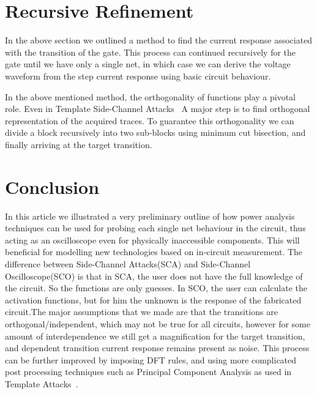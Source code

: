 \documentclass[a4]{IEEEtran}
\begin{document}
\vspace{1em}
\section{Recursive Refinement}
In the above section we outlined a method to find the current response associated with the  transition of the  gate.
This process can continued recursively for the  gate until we have only a single net, in which case we can derive
the voltage waveform from the step current response using basic circuit behaviour.

In the above mentioned method, the orthogonality of  functions play a pivotal role. Even in Template Side-Channel Attacks~\cite{Template}
A major step is to find orthogonal representation of the acquired traces.
To guarantee this orthogonality
we can divide a block recursively into two sub-blocks using minimum cut bisection, and finally arriving at the target transition.

\section{Conclusion}

In this article we illustrated a very preliminary outline of how power analysis techniques can be used for probing each single net 
behaviour in the circuit, thus acting as an oscilloscope even for physically inaccessible components. This will beneficial for modelling 
new technologies based on in-circuit measurement. The difference between Side-Channel Attacks(SCA)
and Side-Channel Oscilloscope(SCO) is that in SCA, the user does not have the full knowledge of the circuit. So the functions  are only guesses.
In SCO, the user can calculate the activation functions, but for him the unknown is the response of the fabricated circuit.The major assumptions that we made
are that the transitions are orthogonal/independent, which may not be true for all circuits, however for some amount of interdependence
we still get a magnification for the target transition, and dependent transition current response  remains present as noise. 
This process can be further improved by imposing DFT rules, and using more complicated post processing techniques such as Principal Component Analysis
as used in Template Attacks~\cite{Template}.


  
\end{document}
